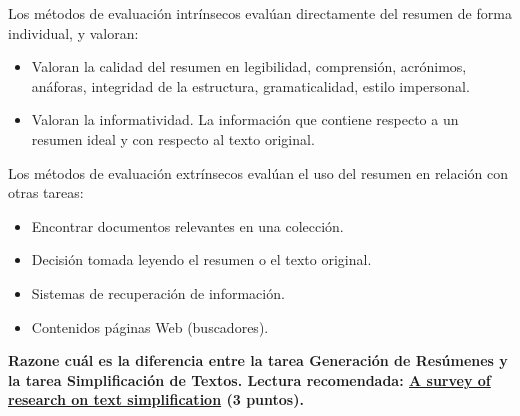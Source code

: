 \documentclass[11pt]{exam}
\begin{document}
\begin{questions}
Los métodos de evaluación intrínsecos evalúan directamente del resumen de forma individual, y valoran:

\begin{itemize}
	\item Valoran la calidad del resumen en legibilidad, comprensión, acrónimos, anáforas, integridad de la estructura, gramaticalidad, estilo impersonal.
	\item Valoran la informatividad. La información que contiene respecto a un resumen ideal y con respecto al texto original.
\end{itemize}

Los métodos de evaluación extrínsecos evalúan el uso del resumen en relación con otras tareas:

\begin{itemize}
	\item Encontrar documentos relevantes en una colección.
	\item Decisión tomada leyendo el resumen o el texto original.
	\item Sistemas de recuperación de información.
	\item Contenidos páginas Web (buscadores).
\end{itemize}

{\bf \question Razone cuál es la diferencia entre la tarea Generación de Resúmenes y la tarea Simplificación de Textos. Lectura recomendada: \href{https://pdfs.semanticscholar.org/8a30/f16ed3a83734c4ec087191401a8f241aa3a9.pdf}{A survey of research on text simplification} (3 puntos).}

\end{questions}
	
\end{document}
